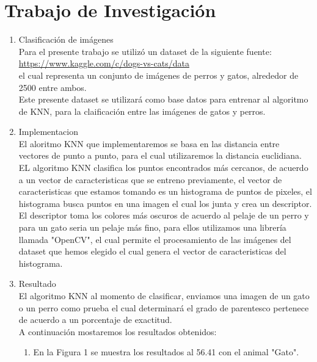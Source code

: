 \documentclass{article}
\begin{document}
	\section{Trabajo de Investigación}\label{sec:ejercicios}
	\begin{enumerate}
		\item Clasificación de imágenes\\
		Para el presente  trabajo se utilizó un dataset de la siguiente fuente: 
		\url{https://www.kaggle.com/c/dogs-vs-cats/data}\\
		el cual representa un conjunto de imágenes de perros y gatos, alrededor de 2500 entre ambos.\\
		Este presente dataset se utilizará como base datos para entrenar al algoritmo de KNN, para la claificación entre las imágenes de gatos y perros.\\
		
	   
		\item Implementacion\\
		El aloritmo KNN que implementaremos se basa en las distancia entre vectores de punto a punto, para el cual utilizaremos la distancia euclidiana.\\
		EL algoritmo KNN clasifica los puntos encontrados más cercanos, de acuerdo a un vector de caracteristicas que se entreno previamente, el vector de caracteristicas que estamos tomando es un histograma de puntos de pixeles, el histograma busca puntos en una imagen el cual los junta y crea un descriptor.\\
		El descriptor toma los colores más oscuros de acuerdo al pelaje de un perro y para un gato seria un pelaje más fino, para ellos utilizamos una librería llamada "OpenCV", el cual permite el procesamiento de las imágenes del dataset que hemos elegido el cual genera el vector de caracteristicas del histograma.\\
		
		
\item Resultado\\
 El algoritmo KNN al momento de clasificar, enviamos una imagen de un gato o un perro como prueba el cual determinará el grado de parentesco pertenece de acuerdo a un porcentaje de exactitud.\\
 A continuación mostaremos los resultados obtenidos:\\
 
    \begin{enumerate}
        
        \item En la Figura 1 se muestra los resultados al 56.41 con el animal "Gato". \\\\
    

\end{enumerate}
\end{enumerate}
\end{document}
